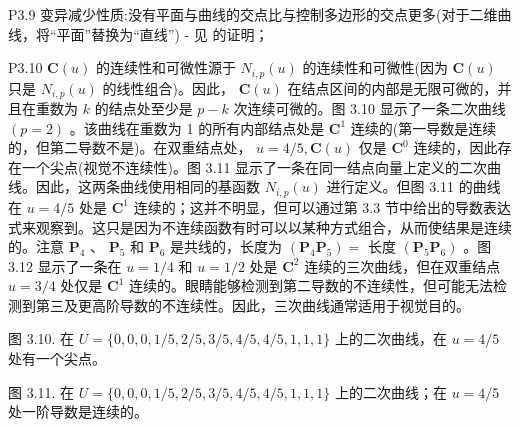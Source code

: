 \documentclass[../main.tex]{subfiles}
\begin{document}
P3.9 变异减少性质:没有平面与曲线的交点比与控制多边形的交点更多(对于二维曲线，将“平面”替换为“直线”) - 见 \cite{Lane83} 的证明；





P3.10 \(\mathbf{C}\left( u\right)\) 的连续性和可微性源于 \({N}_{i,p}\left( u\right)\) 的连续性和可微性(因为 \(\mathbf{C}\left( u\right)\) 只是 \({N}_{i,p}\left( u\right)\) 的线性组合)。因此， \(\mathbf{C}\left( u\right)\) 在结点区间的内部是无限可微的，并且在重数为 \(k\) 的结点处至少是 \(p - k\) 次连续可微的。图 3.10 显示了一条二次曲线 \(\left( {p = 2}\right)\) 。该曲线在重数为 1 的所有内部结点处是 \({\mathbf{C}}^{1}\) 连续的(第一导数是连续的，但第二导数不是)。在双重结点处， \(u = 4/5,\mathbf{C}\left( u\right)\) 仅是 \({\mathbf{C}}^{0}\) 连续的，因此存在一个尖点(视觉不连续性)。图 3.11 显示了一条在同一结点向量上定义的二次曲线。因此，这两条曲线使用相同的基函数 \({N}_{i,p}\left( u\right)\) 进行定义。但图 3.11 的曲线在 \(u = 4/5\) 处是 \({\mathbf{C}}^{1}\) 连续的；这并不明显，但可以通过第 3.3 节中给出的导数表达式来观察到。这只是因为不连续函数有时可以以某种方式组合，从而使结果是连续的。注意 \({\mathbf{P}}_{4}\) 、 \({\mathbf{P}}_{5}\) 和 \({\mathbf{P}}_{6}\) 是共线的，长度为 \(\left( {{\mathbf{P}}_{4}{\mathbf{P}}_{5}}\right)  =\) 长度 \(\left( {{\mathbf{P}}_{5}{\mathbf{P}}_{6}}\right)\) 。图 3.12 显示了一条在 \(u = 1/4\) 和 \(u = 1/2\) 处是 \({\mathbf{C}}^{2}\) 连续的三次曲线，但在双重结点 \(u = 3/4\) 处仅是 \({\mathbf{C}}^{1}\) 连续的。眼睛能够检测到第二导数的不连续性，但可能无法检测到第三及更高阶导数的不连续性。因此，三次曲线通常适用于视觉目的。



\begin{center}
\begin{minipage}{17cm}
\vspace*{.6\baselineskip}
\centering
{}
\par\smallskip
图 3.10. 在 \(U = \{ 0,0,0,1/5,2/5,3/5,4/5,4/5,1,1,1\}\) 上的二次曲线，在 \(u = 4/5\) 处有一个尖点。
\end{minipage}
\end{center}





\begin{center}
\begin{minipage}{18cm}
\vspace*{.6\baselineskip}
\centering
{}
\par\smallskip
图 3.11. 在 \(U = \{ 0,0,0,1/5,2/5,3/5,4/5,4/5,1,1,1\}\) 上的二次曲线；在 \(u = 4/5\) 处一阶导数是连续的。
\end{minipage}
\end{center}
\end{document}
